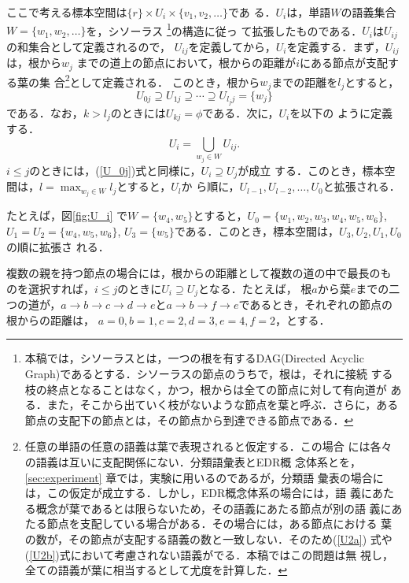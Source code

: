 ここで考える標本空間は$\{r\} \times U_i \times \{v_1,v_2,\ldots\}$であ
る．$U_i$は，単語$W$の語義集合$W=\{w_1,w_2,\ldots\}$を，シソーラス
\footnote {本稿では，シソーラスとは，一つの根を有するDAG(Directed
Acyclic Graph)であるとする．シソーラスの節点のうちで，根は，それに接続
する枝の終点となることはなく，かつ，根からは全ての節点に対して有向道が
ある．また，そこから出ていく枝がないような節点を葉と呼ぶ．さらに，ある
節点の支配下の節点とは，その節点から到達できる節点である．}の構造に従っ
て拡張したものである．$U_i$は$U_{ij}$の和集合として定義されるので，
$U_{ij}$を定義してから，$U_i$を定義する．まず，$U_{ij}$は，根から$w_j$
までの道上の節点において，根からの距離が$i$にある節点が支配する葉の集
合\footnote{任意の単語の任意の語義は葉で表現されると仮定する．この場合
には各々の語義は互いに支配関係にない．分類語彙表\cite{Kokken64}とEDR概
念体系とを，\ref{sec:experiment} 章では，実験に用いるのであるが，分類語
彙表の場合には，この仮定が成立する．しかし，EDR概念体系の場合には，語
義にあたる概念が葉であるとは限らないため，その語義にあたる節点が別の語
義にあたる節点を支配している場合がある．その場合には，ある節点における
葉の数が，その節点が支配する語義の数と一致しない．そのため(\ref{U2a})
式や(\ref{U2b})式において考慮されない語義がでる．本稿ではこの問題は無
視し，全ての語義が葉に相当するとして尤度を計算した．}として定義される．
このとき，根から$w_j$までの距離を$l_j$とすると，
\begin{equation}
  \label{U_0j}
  U_{0j} \supseteq U_{1j} \supseteq \cdots \supseteq U_{l_j j} = \{w_j\}
\end{equation}
である．なお，$k>l_j$のときには$U_{kj}=\phi$である．次に，$U_i$を以下の
ように定義する．
\begin{equation}
  \label{U_i}
  U_i = \bigcup_{w_j \in W} U_{ij}.
\end{equation}
$i \le j$のときには，(\ref{U_0j})式と同様に，$U_i \supseteq U_j$が成立
する．このとき，標本空間は，$l=\max_{w_j \in W} l_j$とすると，$U_l$か
ら順に，$U_{l-1}, U_{l-2}, \ldots, U_0$と拡張される．

たとえば，図\ref{fig:U_i} で$W = \{w_4,w_5\}$とすると，$U_0 =
\{w_1,w_2,w_3,w_4,w_5,w_6\}$, $U_1 = U_2 = \{w_4,w_5,w_6\}$, $U_3 =
\{w_5\}$である．このとき，標本空間は，$U_3, U_2, U_1, U_0$の順に拡張さ
れる．

複数の親を持つ節点の場合には，根からの距離として複数の道の中で最長のも
のを選択すれば，$i \le j$のときに$U_i \supseteq U_j$となる．たとえば，
根$a$から葉$e$までの二つの道が，$a \rightarrow b \rightarrow c
\rightarrow d \rightarrow e$と$a \rightarrow b \rightarrow f
\rightarrow e$であるとき，それぞれの節点の根からの距離は，
$a=0,b=1,c=2,d=3,e=4,f=2$，とする．

